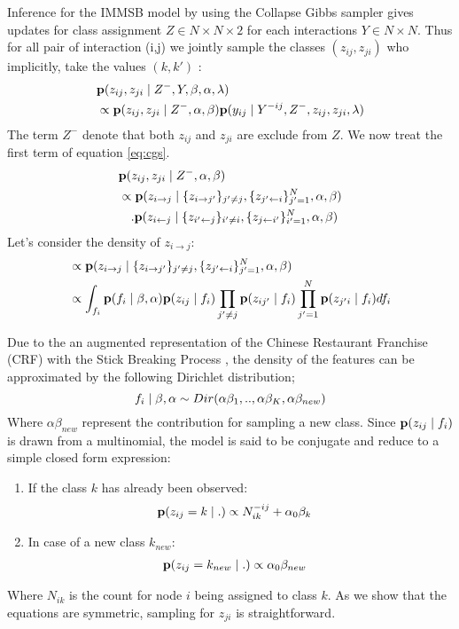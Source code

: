 Inference for the IMMSB model by using the Collapse Gibbs sampler gives updates for class assignment $Z \in N\times N \times 2$ for each interactions $Y \in N\times N$. Thus for all pair of interaction (i,j) we jointly sample the classes $(z_{ij}, z_{ji})$ who implicitly, take the values $(k,k')$ :
\begin{align} \label{eq:cgs}
&\pr(z_{ij}, z_{ji} \mid Z^-, Y,  \mat{\beta}, \alpha, \mat{\lambda} )  \\
&\propto\pr(z_{ij}, z_{ji} \mid Z^-, \alpha,\mat{\beta}) \pr(y_{ij} \mid Y^{-ij},  Z^-,z_{ij}, z_{ji},  \mat{\lambda} ) \nonumber
\end{align}
The term $Z^-$ denote that both $z_{ij}$ and $z_{ji}$ are exclude from $Z$. We now treat the first term of equation \ref{eq:cgs}.  
\begin{align}
&\mathbf{p}(z_{ij}, z_{ji} \mid Z^-, \alpha,\mathbf{\beta})\\
&\propto \mathbf{p}(z_{i\rightarrow j} \mid \{z_{i\rightarrow j'}\}_{j'\neq j}, \{z_{j'\leftarrow i}\}_{j'=1}^N, \alpha,\mathbf{\beta}) \\
& \quad .  \mathbf{p}(z_{i\leftarrow j} \mid \{z_{i'\leftarrow j}\}_{i'\neq i}, \{z_{j\leftarrow i'}\}_{i'=1}^N, \alpha,\mathbf{\beta}) \nonumber
\end{align}
Let's consider the density of $z_{i\rightarrow j}$:
\begin{align}
&\propto \mathbf{p}(z_{i\rightarrow j} \mid \{z_{i\rightarrow j'}\}_{j'\neq j}, \{z_{j'\leftarrow i}\}_{j'=1}^N, \alpha,\mathbf{\beta})  \\
&\propto \int_{f_i} \mathbf{p}(f_i \mid \mathbf{\beta}, \alpha) \mathbf{p}(z_{ij} \mid f_i) \prod_{j'\neq j} \mathbf{p}(z_{ij'} \mid f_i) \prod_{j' =  1}^N  \mathbf{p}(z_{j' i} \mid f_i)  df_i \nonumber
\end{align}


Due to the an augmented representation of the Chinese Restaurant Franchise (CRF) with the Stick Breaking Process \cite{HDP}, the density of the features can be approximated by the following Dirichlet distribution;
\begin{equation}
f_i \mid \mathbf{\beta}, \alpha \sim Dir(\alpha \beta_1,..,\alpha\beta_K, \alpha\beta_{new})
\end{equation}
Where $\alpha\beta_{new}$ represent the contribution for sampling a new class. Since $\mathbf{p}(z_{ij} \mid f_i)$ is drawn from a multinomial, the model is said to be conjugate and reduce to a simple closed form expression:
\begin{enumerate}
\item If the class $k$ has already been observed:
   \begin{align}
    \pr(z_{ij} =k \mid .) &\propto N_{ik}^{-ij} + \alpha_0 \beta_k
    \label{eq:update-immsb}
   \end{align}
\item In case of a new class $k_{new}$:
   \begin{align}
    \mathbf{p}(z_{ij} =k_{new} \mid.) &\propto \alpha_0 \beta_{new} \nonumber   
   \end{align}
\end{enumerate}
 Where  $N_{ik}$ is the count for node $i$ being assigned to class $k$. As we show that the equations are symmetric, sampling for $z_{ji}$ is straightforward.

